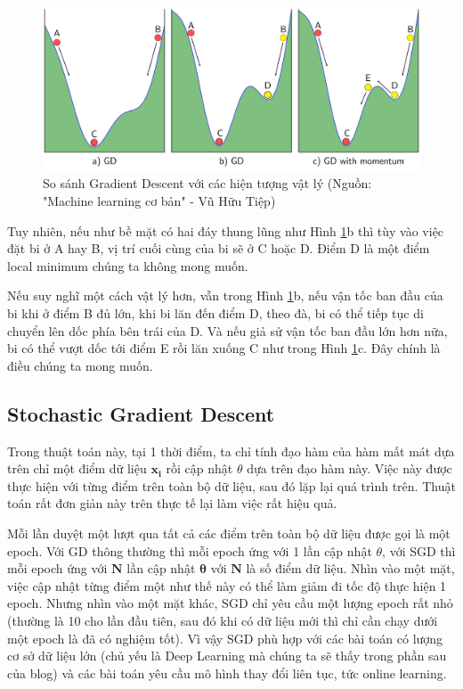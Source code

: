 \FloatBarrier
\begin{figure}[htp]
\begin{center}
\includegraphics[scale=0.06]{chap4/c4_figs/momentum.png}
\end{center}
\caption{So sánh Gradient Descent với các hiện tượng vật lý (Nguồn: "Machine learning cơ bản" - Vũ Hữu Tiệp)}
\label{fig:gradient}
\end{figure}
\FloatBarrier

Tuy nhiên, nếu như bề mặt có hai đáy thung lũng như Hình \ref{fig:gradient}b thì tùy vào việc đặt bi ở A hay B, vị trí cuối cùng của bi sẽ ở C hoặc D. Điểm D là một điểm local minimum chúng ta không mong muốn.

Nếu suy nghĩ một cách vật lý hơn, vẫn trong Hình \ref{fig:gradient}b, nếu vận tốc ban đầu của bi khi ở điểm B đủ lớn, khi bi lăn đến điểm D, theo đà, bi có thể tiếp tục di chuyển lên dốc phía bên trái của D. Và nếu giả sử vận tốc ban đầu lớn hơn nữa, bi có thể vượt dốc tới điểm E rồi lăn xuống C như trong Hình \ref{fig:gradient}c. Đây chính là điều chúng ta mong muốn.

\subsection{Stochastic Gradient Descent}
Trong thuật toán này, tại 1 thời điểm, ta chỉ tính đạo hàm của hàm mất mát dựa trên chỉ một điểm dữ liệu $\mathbf{x_i}$ rồi cập nhật 
$\theta$ dựa trên đạo hàm này. Việc này được thực hiện với từng điểm trên toàn bộ dữ liệu, sau đó lặp lại quá trình trên. Thuật toán rất đơn giản này trên thực tế lại làm việc rất hiệu quả.

Mỗi lần duyệt một lượt qua tất cả các điểm trên toàn bộ dữ liệu được gọi là một epoch. Với GD thông thường thì mỗi epoch ứng với 1 lần cập nhật $\theta$, với SGD thì mỗi epoch ứng với $\mathbf{N}$ lần cập nhật $\mathbf{\theta}$ với $\mathbf{N}$ là số điểm dữ liệu. Nhìn vào một mặt, việc cập nhật từng điểm một như thế này có thể làm giảm đi tốc độ thực hiện 1 epoch. Nhưng nhìn vào một mặt khác, SGD chỉ yêu cầu một lượng epoch rất nhỏ (thường là 10 cho lần đầu tiên, sau đó khi có dữ liệu mới thì chỉ cần chạy dưới một epoch là đã có nghiệm tốt). Vì vậy SGD phù hợp với các bài toán có lượng cơ sở dữ liệu lớn (chủ yếu là Deep Learning mà chúng ta sẽ thấy trong phần sau của blog) và các bài toán yêu cầu mô hình thay đổi liên tục, tức online learning.


